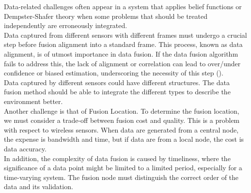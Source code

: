 Data-related challenges often appear in a system that applies belief functions or Dempster-Shafer theory \cite{meng2020survey} when some problems that should be treated independently are erroneously integrated.\\

 Data captured from different sensors with different frames must undergo a crucial step before fusion alignment into a standard frame. This process, known as data alignment, is of utmost importance in data fusion. If the data fusion algorithm fails to address this, the lack of alignment or correlation can lead to over/under confidence or biased estimation, underscoring the necessity of this step (\cite{meng2020survey}).\\
 
Data captured by different sensors could have different structures. The data fusion method should be able to integrate the different types to describe the environment better.\\

Another challenge is that of Fusion Location. To determine the fusion location, we must consider a trade-off between fusion cost and quality. This is a problem with respect to wireless sensors. When data are generated from a central node, the expense is bandwidth and time, but if data are from a local node, the cost is data accuracy.\\

In addition, the complexity of data fusion is caused by timeliness, where the significance of a data point might be limited to a limited period, especially for a time-varying system. The fusion node must distinguish the correct order of the data and its validation. 


